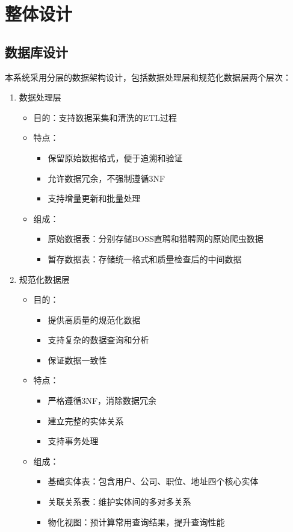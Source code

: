 \section{整体设计}
\subsection{数据库设计}

本系统采用分层的数据架构设计，包括数据处理层和规范化数据层两个层次：
\begin{enumerate}
  \item 数据处理层
  \begin{itemize}
    \item 目的：支持数据采集和清洗的ETL过程
    \item 特点：
    \begin{itemize}
      \item 保留原始数据格式，便于追溯和验证
      \item 允许数据冗余，不强制遵循3NF
      \item 支持增量更新和批量处理
    \end{itemize}
    \item 组成：
    \begin{itemize}
      \item 原始数据表：分别存储BOSS直聘和猎聘网的原始爬虫数据
      \item 暂存数据表：存储统一格式和质量检查后的中间数据
    \end{itemize}
  \end{itemize}

  \item 规范化数据层
  \begin{itemize}
    \item 目的：
    \begin{itemize}
      \item 提供高质量的规范化数据
      \item 支持复杂的数据查询和分析
      \item 保证数据一致性
    \end{itemize}
    \item 特点：
    \begin{itemize}
      \item 严格遵循3NF，消除数据冗余
      \item 建立完整的实体关系
      \item 支持事务处理
    \end{itemize}
    \item 组成：
    \begin{itemize}
      \item 基础实体表：包含用户、公司、职位、地址四个核心实体
      \item 关联关系表：维护实体间的多对多关系
      \item 物化视图：预计算常用查询结果，提升查询性能
    \end{itemize}
  \end{itemize}
\end{enumerate}

